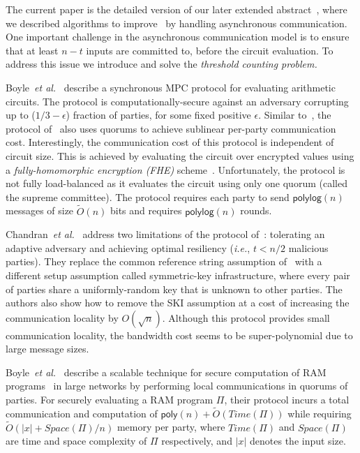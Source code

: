 \documentclass[11pt,letter]{article}
\newcommand{\ie}{\emph{i.e.}}
\newcommand{\etal}{\emph{et al.}}
\theoremstyle{mytheoremstyle}
\begin{document}
\begin{description}
	The current paper is the detailed version of our later extended abstract~\cite{DKMS-ICDCN-2014}, where we described algorithms to improve~\cite{Dani:2012:BAB:2332432.2332473} by handling asynchronous communication. One important challenge in the asynchronous communication model is to ensure that at least $n-t$ inputs are committed to, before the circuit evaluation. To address this issue we introduce and solve the \emph{threshold counting problem.}
	
	Boyle~\etal~\cite{Boyle:2013:CLS:2450206.2450227} describe a synchronous MPC protocol for evaluating arithmetic circuits. The protocol is computationally-secure against an adversary corrupting up to ($1/3-\epsilon$) fraction of parties, for some fixed positive $\epsilon$. Similar to~\cite{Dani:2012:BAB:2332432.2332473}, the protocol of~\cite{Boyle:2013:CLS:2450206.2450227} also uses quorums to achieve sublinear per-party communication cost. Interestingly, the communication cost of this protocol is independent of circuit size. This is achieved by evaluating the circuit over encrypted values using a \emph{fully-homomorphic encryption (FHE)} scheme~\cite{Gentry:2009:FHE:1536414.1536440}. Unfortunately, the protocol is not fully load-balanced as it evaluates the circuit using only one quorum (called the supreme committee). The protocol requires each party to send $\mathsf{polylog}(n)$ messages of size $\tilde{O}(n)$ bits and requires $\mathsf{polylog}(n)$ rounds.
	
	Chandran~\etal~\cite{cryptoeprint:2014:615} address two limitations of the protocol of~\cite{Boyle:2013:CLS:2450206.2450227}: tolerating an adaptive adversary and achieving optimal resiliency (\ie, $t<n/2$ malicious parties). They replace the common reference string assumption of~\cite{Boyle:2013:CLS:2450206.2450227} with a different setup assumption called symmetric-key infrastructure, where every pair of parties share a uniformly-random key that is unknown to other parties. The authors also show how to remove the SKI assumption at a cost of increasing the communication locality by $O(\sqrt{n})$. Although this protocol provides small communication locality, the bandwidth cost seems to be super-polynomial due to large message sizes.
	


Boyle~\etal~\cite{cryptoeprint:2014:404} describe a scalable technique for secure computation of RAM programs~\cite{Goldreich:1996:SPS:233551.233553} in large networks by performing local communications in quorums of parties. For securely evaluating a RAM program $\Pi$, their protocol incurs a total communication and computation of $\mathsf{poly}(n) + \tilde{O}(Time(\Pi))$ while requiring $\tilde{O}(|x| + Space(\Pi)/n)$ memory per party, where $Time(\Pi)$ and $Space(\Pi)$ are time and space complexity of $\Pi$ respectively, and $|x|$ denotes the input size.
	

\end{description}
\end{document}
